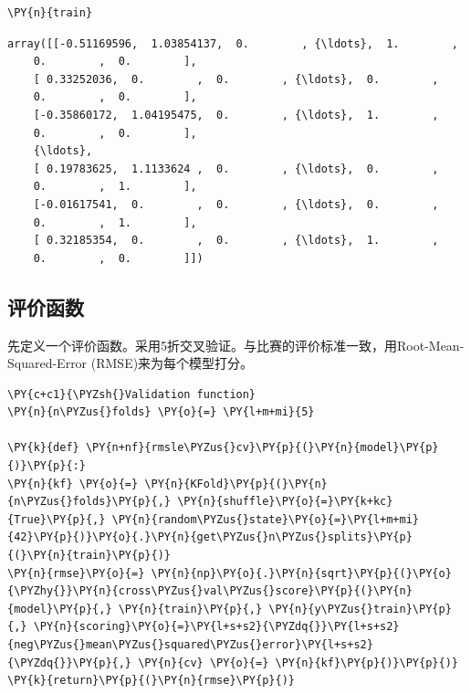 \documentclass[no-math]{YangThesis}
\begin{document}
\begin{tcolorbox}[breakable, size=fbox, boxrule=1pt, pad at break*=1mm,colback=cellbackground, colframe=cellborder]
	\begin{Verbatim}[commandchars=\\\{\}]
\PY{n}{train}
	\end{Verbatim}
\end{tcolorbox}

\begin{tcolorbox}[breakable, size=fbox, boxrule=.5pt, pad at break*=1mm, opacityfill=0]
	\begin{Verbatim}[commandchars=\\\{\}]
	array([[-0.51169596,  1.03854137,  0.        , {\ldots},  1.        ,
	0.        ,  0.        ],
	[ 0.33252036,  0.        ,  0.        , {\ldots},  0.        ,
	0.        ,  0.        ],
	[-0.35860172,  1.04195475,  0.        , {\ldots},  1.        ,
	0.        ,  0.        ],
	{\ldots},
	[ 0.19783625,  1.1133624 ,  0.        , {\ldots},  0.        ,
	0.        ,  1.        ],
	[-0.01617541,  0.        ,  0.        , {\ldots},  0.        ,
	0.        ,  1.        ],
	[ 0.32185354,  0.        ,  0.        , {\ldots},  1.        ,
	0.        ,  0.        ]])
	\end{Verbatim}
\end{tcolorbox}

\hypertarget{ux8bc4ux4ef7ux51fdux6570}{%
	\subsection{评价函数}\label{ux8bc4ux4ef7ux51fdux6570}}

先定义一个评价函数。采用5折交叉验证。与比赛的评价标准一致，用Root-Mean-Squared-Error
(RMSE)来为每个模型打分。

\begin{tcolorbox}[breakable, size=fbox, boxrule=1pt, pad at break*=1mm,colback=cellbackground, colframe=cellborder]
	\begin{Verbatim}[commandchars=\\\{\}]
\PY{c+c1}{\PYZsh{}Validation function}
\PY{n}{n\PYZus{}folds} \PY{o}{=} \PY{l+m+mi}{5}

\PY{k}{def} \PY{n+nf}{rmsle\PYZus{}cv}\PY{p}{(}\PY{n}{model}\PY{p}{)}\PY{p}{:}
\PY{n}{kf} \PY{o}{=} \PY{n}{KFold}\PY{p}{(}\PY{n}{n\PYZus{}folds}\PY{p}{,} \PY{n}{shuffle}\PY{o}{=}\PY{k+kc}{True}\PY{p}{,} \PY{n}{random\PYZus{}state}\PY{o}{=}\PY{l+m+mi}{42}\PY{p}{)}\PY{o}{.}\PY{n}{get\PYZus{}n\PYZus{}splits}\PY{p}{(}\PY{n}{train}\PY{p}{)}
\PY{n}{rmse}\PY{o}{=} \PY{n}{np}\PY{o}{.}\PY{n}{sqrt}\PY{p}{(}\PY{o}{\PYZhy{}}\PY{n}{cross\PYZus{}val\PYZus{}score}\PY{p}{(}\PY{n}{model}\PY{p}{,} \PY{n}{train}\PY{p}{,} \PY{n}{y\PYZus{}train}\PY{p}{,} \PY{n}{scoring}\PY{o}{=}\PY{l+s+s2}{\PYZdq{}}\PY{l+s+s2}{neg\PYZus{}mean\PYZus{}squared\PYZus{}error}\PY{l+s+s2}{\PYZdq{}}\PY{p}{,} \PY{n}{cv} \PY{o}{=} \PY{n}{kf}\PY{p}{)}\PY{p}{)}
\PY{k}{return}\PY{p}{(}\PY{n}{rmse}\PY{p}{)}
	\end{Verbatim}
\end{tcolorbox}
\end{document}
